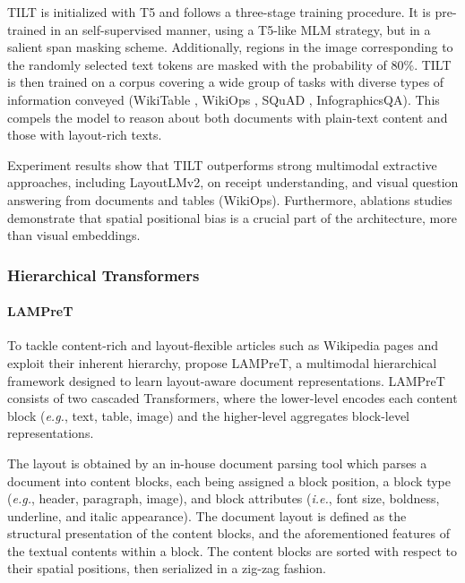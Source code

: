 TILT is initialized with \ac{T5} and follows a three-stage training procedure. It is pre-trained in an self-supervised manner, using a T5-like \ac{MLM} strategy, but in a salient span masking scheme. Additionally, regions in the image corresponding to the randomly selected text tokens are masked with the probability of 80\%. TILT is then trained on a corpus covering a wide group of tasks with diverse types of information conveyed (WikiTable \citep{cho2018adversarial}, WikiOps \citep{pasupat2015compositional}, SQuAD \citep{rajpurkar2016squad}, InfographicsQA). This compels the model to reason about both documents with plain-text content and those with layout-rich texts.

Experiment results show that TILT outperforms strong multimodal extractive approaches, including LayoutLMv2, on receipt understanding, and visual question answering from documents and tables (WikiOps). Furthermore, ablations studies demonstrate that spatial positional bias is a crucial part of the architecture, more than visual embeddings. 


\subsubsection{Hierarchical Transformers}

\paragraph{LAMPreT} 

To tackle content-rich and layout-flexible articles such as Wikipedia pages and exploit their inherent hierarchy, \citet{wu2021lampret} propose \ac{LAMPreT}, a multimodal hierarchical framework designed to learn layout-aware document representations. LAMPreT consists of two cascaded Transformers, where the lower-level encodes each content block (\textit{e.g.}, text, table, image) and the higher-level aggregates block-level representations.

The layout is obtained by an in-house document parsing tool which parses a document into content blocks, each being assigned a block position, a block type (\textit{e.g.}, header, paragraph, image), and block attributes (\textit{i.e.}, font size, boldness, underline, and italic appearance). The document layout is defined as the structural presentation of the content blocks, and the aforementioned features of the textual contents within a block. The content blocks are sorted with respect to their spatial positions, then serialized in a zig-zag fashion.

